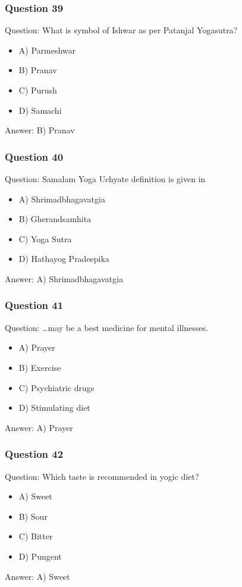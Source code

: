 \begin{frame}[fragile]\frametitle{Question 39}
Question: What is symbol of Ishwar as per Patanjal Yogasutra?
\begin{itemize}
\item A) Parmeshwar
\item B) Pranav
\item C) Purush
\item D) Samachi
\end{itemize}
Answer: B) Pranav
\end{frame}

\begin{frame}[fragile]\frametitle{Question 40}
Question: Samalam Yoga Uchyate definition is given in
\begin{itemize}
\item A) Shrimadbhagavatgia
\item B) Gherandsamhita
\item C) Yoga Sutra
\item D) Hathayog Pradeepika
\end{itemize}
Answer: A) Shrimadbhagavatgia
\end{frame}

\begin{frame}[fragile]\frametitle{Question 41}
Question: \ldots may be a best medicine for mental illnesses.
\begin{itemize}
\item A) Prayer
\item B) Exercise
\item C) Psychiatric drugs
\item D) Stimulating diet
\end{itemize}
Answer: A) Prayer
\end{frame}

\begin{frame}[fragile]\frametitle{Question 42}
Question: Which taste is recommended in yogic diet?
\begin{itemize}
\item A) Sweet
\item B) Sour
\item C) Bitter
\item D) Pungent
\end{itemize}
Answer: A) Sweet
\end{frame}

